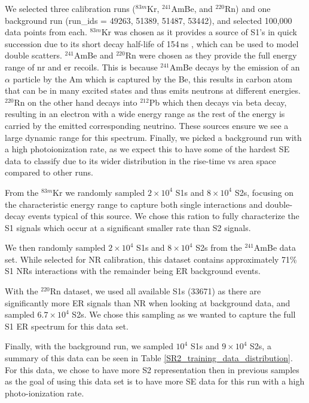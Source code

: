 We selected three calibration runs ($^{83m}$Kr, $^{241}$AmBe, and  $^{220}$Rn) and one background run (run\_ids = 49263, 51389, 51487, 53442), and selected 100,000 data points from each. $^{83m}$Kr was chosen as it provides a source of S1's in quick succession due to its short decay half-life of 154\,ns \cite{Kastens:2009pa}, which can be used to model double scatters. $^{241}$AmBe and  $^{220}$Rn were chosen as they provide the full energy range of \acrfull{nr} and \acrfull{er} recoils. This is because $^{241}$AmBe decays by the emission of an $\alpha$ particle by the Am which is captured by the Be, this results in carbon atom that can be in many excited states and thus emits neutrons at different energies. $^{220}$Rn on the other hand decays into $^{212}$Pb which then decays via beta decay, resulting in an electron with a wide energy range as the rest of the energy is carried by the emitted corresponding neutrino. These sources ensure we see a large dynamic range for this spectrum. Finally, we picked a background run with a high photoionization rate, as we expect this to have some of the hardest SE data to classify due to its wider distribution in the rise-time vs area space compared to other runs. 

From the $^{83m}$Kr we randomly sampled $2 \times10^4$ S1s and $8 \times10^4$ S2s,
focusing on the characteristic energy range to capture both single interactions and double-decay events typical of this source. We chose this ration to fully characterize the S1 signals which occur at a significant smaller rate than S2 signals.


We then randomly sampled $2 \times10^4$ S1s and $8 \times10^4$ S2s from the $^{241}$AmBe data set. 
While selected for NR calibration, this dataset contains approximately 71\% S1 NRs interactions with the remainder being ER background events.


With the  $^{220}$Rn dataset, we used all available S1s (33671) as there are significantly more ER signals than NR when looking at background data, and sampled $6.7 \times10^4$ S2s. We chose this sampling as we wanted to capture the full S1 ER spectrum for this data set.

Finally, with the background run, we sampled $10^4$ S1s and $9 \times10^4$ S2s, a summary of this data can be seen in Table \ref{SR2_training_data_distribution}. For this data, we chose to have more S2 representation then in previous samples as the goal of using this data set is to have more SE data for this run with a high photo-ionization rate.

